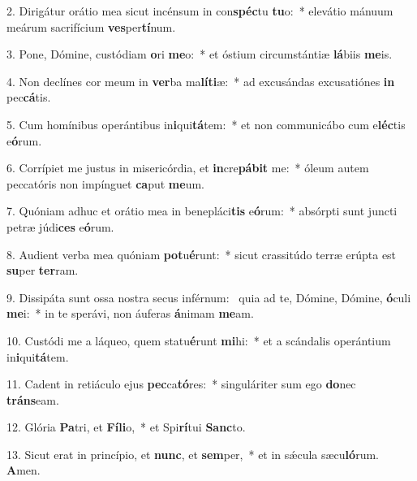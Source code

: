 2. Dirigátur orátio mea sicut incénsum in con\textbf{spéc}tu \textbf{tu}o:~*  elevátio mánuum meárum sacrifícium \textbf{ves}per\textbf{tí}num.\

3. Pone, Dómine, custódiam \textbf{o}ri \textbf{me}o:~*  et óstium circumstántiæ \textbf{lá}biis \textbf{me}is.\

4. Non declínes cor meum in \textbf{ver}ba ma\textbf{lí}\textbf{ti}æ:~*  ad excusándas excusatiónes \textbf{in} pec\textbf{cá}tis.\

5. Cum homínibus operántibus in\textbf{i}qui\textbf{tá}tem:~*  et non communicábo cum e\textbf{léc}tis e\textbf{ó}rum.\

6. Corrípiet me justus in misericórdia, et \textbf{in}cre\textbf{pá}\textbf{bit} me:~*  óleum autem peccatóris non impínguet \textbf{ca}put \textbf{me}um.\

7. Quóniam adhuc et orátio mea in benepláci\textbf{tis} e\textbf{ó}rum:~*  absórpti sunt juncti petræ júdi\textbf{ces} e\textbf{ó}rum.\

8. Audient verba mea quóniam \textbf{pot}u\textbf{é}runt:~*  sicut crassitúdo terræ erúpta est \textbf{su}per \textbf{ter}ram.\

9. Dissipáta sunt ossa nostra secus inférnum: \dag\  quia ad te, Dómine, Dómine, \textbf{ó}culi \textbf{me}i:~*  in te sperávi, non áuferas \textbf{á}nimam \textbf{me}am.\

10. Custódi me a láqueo, quem statu\textbf{é}runt \textbf{mi}hi:~*  et a scándalis operántium in\textbf{i}qui\textbf{tá}tem.\

11. Cadent in retiáculo ejus \textbf{pec}ca\textbf{tó}res:~*  singuláriter sum ego \textbf{do}nec \textbf{tráns}eam.\

12. Glória \textbf{Pa}tri, et \textbf{Fí}\textbf{li}o,~*  et Spi\textbf{rí}tui \textbf{Sanc}to.\

13. Sicut erat in princípio, et \textbf{nunc}, et \textbf{sem}per,~*  et in sǽcula sæcu\textbf{ló}rum. \textbf{A}men.\

